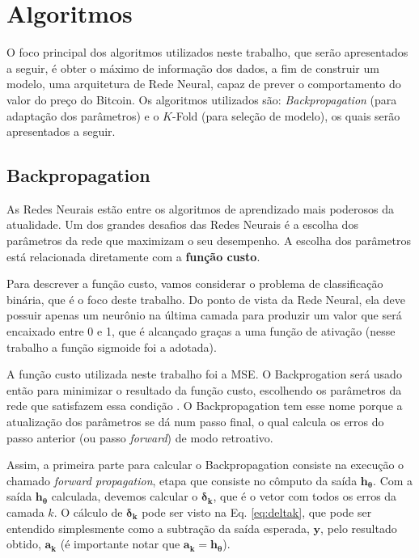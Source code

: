 \section{Algoritmos}
\label{sec:algoritmos}
O foco principal dos algoritmos utilizados neste trabalho, que serão apresentados a seguir, é obter o máximo de informação dos dados, a fim de construir um modelo, uma arquitetura de Rede Neural, capaz de prever o comportamento do valor do preço do Bitcoin. Os algoritmos utilizados são: \emph{Backpropagation} (para adaptação dos parâmetros) e o $K$-Fold (para seleção de modelo), os quais serão apresentados a seguir.
 
\subsection{Backpropagation}
\label{subsec:backpropagation}

 As Redes Neurais estão entre os algoritmos de aprendizado mais poderosos da atualidade. Um dos grandes desafios das Redes Neurais é a escolha dos parâmetros da rede que maximizam o seu desempenho. A escolha dos parâmetros está relacionada diretamente com a \textbf{função custo}.
 
 Para descrever a função custo, vamos considerar o problema de classificação binária, que é o foco deste trabalho. Do ponto de vista da Rede Neural, ela deve possuir apenas um neurônio na última camada para produzir um valor que será encaixado entre 0 e 1, que é alcançado graças a uma função de ativação (nesse trabalho a função sigmoide foi a adotada).
 
 A função custo utilizada neste trabalho foi a MSE. O Backprogation será usado então para minimizar o resultado da função custo, escolhendo os parâmetros da rede que satisfazem essa condição \cite{lehmann2006theory, werbos1974beyond, Rojas1996, werbosBackpropagationthroughtime}. O Backpropagation tem esse nome porque a atualização dos parâmetros se dá num passo final, o qual calcula os erros do passo anterior (ou passo \textit{forward}) de modo retroativo.
 
 Assim, a primeira parte para calcular o Backpropagation consiste na execução o chamado \textit{forward propagation}, etapa que consiste no cômputo da saída $\mathbf{h_\theta}$. Com a saída $\mathbf{h_\theta}$ calculada, devemos calcular o $\mathbf{\delta_k}$, que é o vetor com todos os erros da camada $k$. O cálculo de $\mathbf{\delta_k}$ pode ser visto na Eq. \eqref{eq:deltak}, que pode ser entendido simplesmente como a subtração da saída esperada,  $\mathbf{y}$, pelo resultado obtido, $\mathbf{a_k}$ (é importante notar que $\mathbf{a_k} = \mathbf{h_\theta}$). 
 
